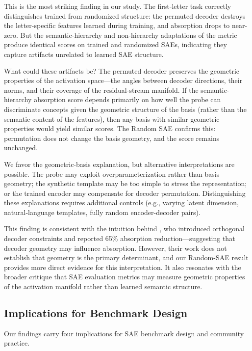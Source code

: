 \documentclass{article}
\begin{document}
This is the most striking finding in our study. The first-letter task correctly distinguishes trained from randomized structure: the permuted decoder destroys the letter-specific features learned during training, and absorption drops to near-zero. But the semantic-hierarchy and non-hierarchy adaptations of the metric produce identical scores on trained and randomized SAEs, indicating they capture artifacts unrelated to learned SAE structure.

What could these artifacts be? The permuted decoder preserves the geometric properties of the activation space---the angles between decoder directions, their norms, and their coverage of the residual-stream manifold. If the semantic-hierarchy absorption score depends primarily on how well the probe can discriminate concepts given the geometric structure of the basis (rather than the semantic content of the features), then any basis with similar geometric properties would yield similar scores. The Random SAE confirms this: permutation does not change the basis geometry, and the score remains unchanged.

We favor the geometric-basis explanation, but alternative interpretations are possible. The probe may exploit overparameterization rather than basis geometry; the synthetic template may be too simple to stress the representation; or the trained encoder may compensate for decoder permutation. Distinguishing these explanations requires additional controls (e.g., varying latent dimension, natural-language templates, fully random encoder-decoder pairs).

This finding is consistent with the intuition behind \citet{korznikov2025ortsae}, who introduced orthogonal decoder constraints and reported 65\% absorption reduction---suggesting that decoder geometry may influence absorption. However, their work does not establish that geometry is the primary determinant, and our Random-SAE result provides more direct evidence for this interpretation. It also resonates with the broader critique that SAE evaluation metrics may measure geometric properties of the activation manifold rather than learned semantic structure.

\subsection{Implications for Benchmark Design}

Our findings carry four implications for SAE benchmark design and community practice.
\end{document}
